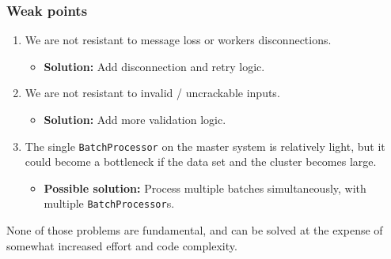 \documentclass{beamer}
\begin{document}
\begin{frame}
	\frametitle{Weak points}

	\begin{enumerate}

		\item We are not resistant to message loss or workers disconnections.
		\begin{itemize}
			\item \textbf{Solution:} Add disconnection and retry logic.
		\end{itemize}

		\item We are not resistant to invalid / uncrackable inputs.

		\begin{itemize}
			\item \textbf{Solution:} Add more validation logic.
		\end{itemize}

		\item The single \texttt{BatchProcessor} on the master system is relatively light, but it could become a bottleneck if the data set and the cluster becomes large.

		\begin{itemize}

			\item \textbf{Possible solution:} Process multiple batches simultaneously, with multiple \texttt{BatchProcessor}s.

		\end{itemize}

	\end{enumerate}

	\pause

	None of those problems are fundamental, and can be solved at the expense of somewhat increased effort and code complexity.

\end{frame}
\end{document}
